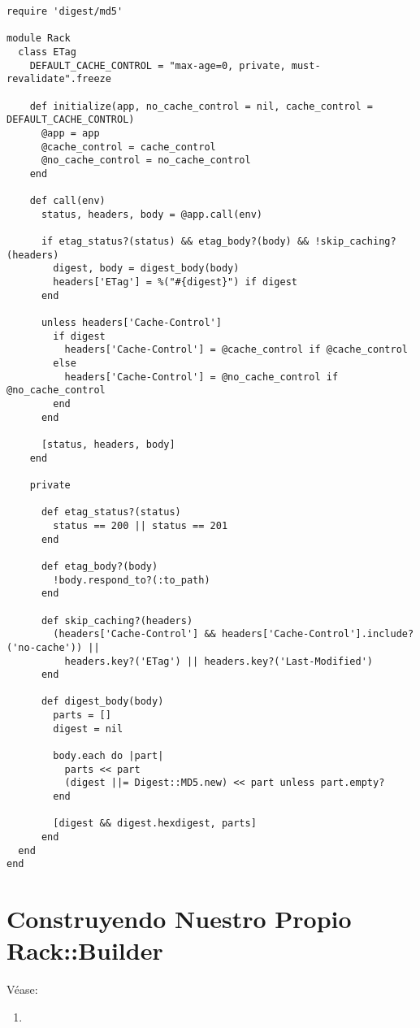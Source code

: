 \begin{verbatim}
require 'digest/md5'

module Rack
  class ETag
    DEFAULT_CACHE_CONTROL = "max-age=0, private, must-revalidate".freeze

    def initialize(app, no_cache_control = nil, cache_control = DEFAULT_CACHE_CONTROL)
      @app = app
      @cache_control = cache_control
      @no_cache_control = no_cache_control
    end

    def call(env)
      status, headers, body = @app.call(env)

      if etag_status?(status) && etag_body?(body) && !skip_caching?(headers)
        digest, body = digest_body(body)
        headers['ETag'] = %("#{digest}") if digest
      end

      unless headers['Cache-Control']
        if digest
          headers['Cache-Control'] = @cache_control if @cache_control
        else
          headers['Cache-Control'] = @no_cache_control if @no_cache_control
        end
      end

      [status, headers, body]
    end

    private

      def etag_status?(status)
        status == 200 || status == 201
      end

      def etag_body?(body)
        !body.respond_to?(:to_path)
      end

      def skip_caching?(headers)
        (headers['Cache-Control'] && headers['Cache-Control'].include?('no-cache')) ||
          headers.key?('ETag') || headers.key?('Last-Modified')
      end

      def digest_body(body)
        parts = []
        digest = nil

        body.each do |part|
          parts << part
          (digest ||= Digest::MD5.new) << part unless part.empty?
        end

        [digest && digest.hexdigest, parts]
      end
  end
end
\end{verbatim}

\section{Construyendo Nuestro Propio Rack::Builder}

Véase:
\begin{enumerate}
\item 
{}
\end{enumerate}

